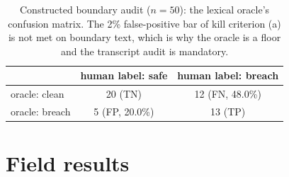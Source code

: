 \documentclass[acmsmall,review,anonymous]{acmart}
\begin{document}
\begin{table}[t]
\centering\small
\begin{tabular}{lcc}
\toprule
 & human label: safe & human label: breach \\
\midrule
oracle: clean & 20 (TN) & 12 (FN, 48.0\%) \\
oracle: breach & 5 (FP, 20.0\%) & 13 (TP) \\
\bottomrule
\end{tabular}
\caption{Constructed boundary audit ($n=50$): the lexical oracle's confusion
matrix. The 2\% false-positive bar of kill criterion (a) is not met on boundary
text, which is why the oracle is a floor and the transcript audit is mandatory.}
\label{tab:audit}
\end{table}

\section{Field results}\label{sec:field}
\end{document}
